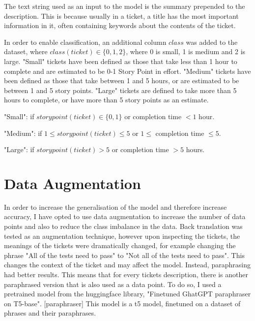 \documentclass{UoYCSproject}
\begin{document}
The text string used as an input to the model is the summary prepended to the description.
This is because usually in a ticket, a title has the most important information in it, often containing keywords about the contents of the ticket. \par

In order to enable classification, an additional column $class$ was added to the dataset, where $class(ticket) \in \{0,1,2\}$, where 0 is small, 1 is medium and 2 is large.
"Small" tickets have been defined as those that take less than 1 hour to complete and are estimated to be 0-1 Story Point in effort.
"Medium" tickets have been defined as those that take between 1 and 5 hours, or are estimated to be between 1 and 5 story points.
"Large" tickets are defined to take more than 5 hours to complete, or have more than 5 story points as an estimate.
    \item "Small": if $storypoint(ticket) \in \{0,1\}$ or completion time $< 1$ hour.
  \item "Medium": if $1 \leq storypoint(ticket) \leq 5$ or $1 \leq$ completion time $\leq 5$.
  \item "Large": if $storypoint(ticket) > 5$ or completion time $> 5$ hours.

%

\section{Data Augmentation}\label{sec:data-augmentation}
    In order to increase the generalisation of the model and therefore increase accuracy, I have opted to use data augmentation to increase the number of data points and also to reduce the class imbalance in the data.
    Back translation was tested as an augmentation technique, however upon inspecting the tickets, the meanings of the tickets were dramatically changed, for example changing the phrase "All of the tests need to pass" to "Not all of the tests need to pass". This changes the context of the ticket and may affect the model.
    Instead, paraphrasing had better results.
    This means that for every tickets description, there is another paraphrased version that is also used as a data point.
    To do so, I used a pretrained model from the huggingface library, "Finetuned GhatGPT paraphraser on T5-base". [paraphraser]
    This model is a t5 model, finetuned on a dataset of phrases and their paraphrases.
\end{document}
